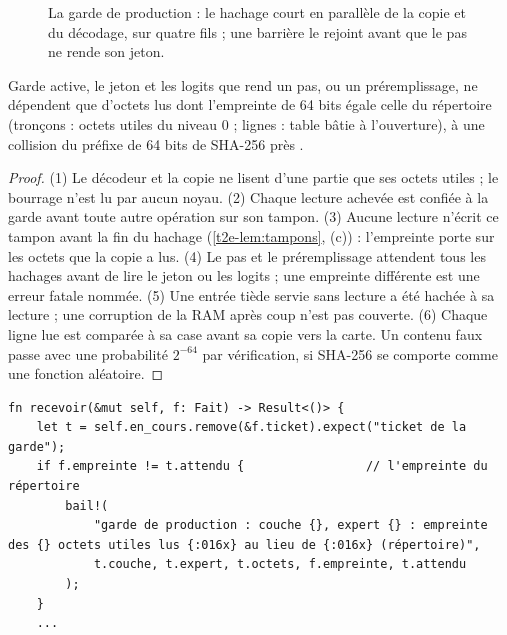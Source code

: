 \begin{figure}[ht]
\centering
\SchemaResGarde
\caption[La garde de production]{La garde de production : le hachage court en parallèle de la copie et du décodage, sur quatre fils ; une barrière le rejoint avant que le pas ne rende son jeton.}
\label{t2e-fig:garde}
\end{figure}

\begin{proposition}\label{t2e-prop:garde}
Garde active, le jeton et les logits que rend un pas, ou un préremplissage, ne dépendent que d'octets lus dont l'empreinte de 64 bits égale celle du répertoire (tronçons : octets utiles du niveau 0 ; lignes : table bâtie à l'ouverture), à une collision du préfixe de 64 bits de SHA-256 près \cite{fips180-4}.
\end{proposition}
\begin{proof}
(1) Le décodeur et la copie ne lisent d'une partie que ses octets utiles ; le bourrage n'est lu par aucun noyau. (2) Chaque lecture achevée est confiée à la garde avant toute autre opération sur son tampon. (3) Aucune lecture n'écrit ce tampon avant la fin du hachage (\cref{t2e-lem:tampons}, (c)) : l'empreinte porte sur les octets que la copie a lus. (4) Le pas et le préremplissage attendent tous les hachages avant de lire le jeton ou les logits ; une empreinte différente est une erreur fatale nommée. (5) Une entrée tiède servie sans lecture a été hachée à sa lecture ; une corruption de la RAM après coup n'est pas couverte. (6) Chaque ligne lue est comparée à sa case avant sa copie vers la carte. Un contenu faux passe avec une probabilité $2^{-64}$ par vérification, si SHA-256 se comporte comme une fonction aléatoire.
\end{proof}

\begin{lstlisting}[language=RustRes, caption={La garde rend un tronçon faux en erreur fatale nommée (\fichier{moteur/crates/trc-ordo/src/garde.rs}, extrait).}, label=t2e-lst:garde]
fn recevoir(&mut self, f: Fait) -> Result<()> {
    let t = self.en_cours.remove(&f.ticket).expect("ticket de la garde");
    if f.empreinte != t.attendu {                 // l'empreinte du répertoire
        bail!(
            "garde de production : couche {}, expert {} : empreinte des {} octets utiles lus {:016x} au lieu de {:016x} (répertoire)",
            t.couche, t.expert, t.octets, f.empreinte, t.attendu
        );
    }
    ...
\end{lstlisting}

